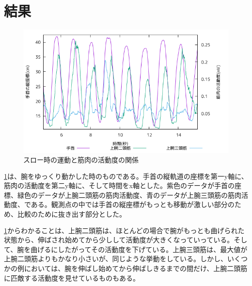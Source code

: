 \documentclass{jsarticle}
\begin{document}
\section{結果}
\begin{figure}[h]
  \begin{center}
    \includegraphics[width=15cm]{images/s1proto.png}
  \end{center}
  \caption{スロー時の運動と筋肉の活動度の関係}
  \label{slowfig}
\end{figure}
\ref{slowfig}は、腕をゆっくり動かした時のものである。手首の縦軌道の座標を第一y軸に、筋肉の活動度を第二y軸に、そして時間をx軸とした。紫色のデータが手首の座標、緑色のデータが上腕二頭筋の筋肉活動度、青のデータが上腕三頭筋の筋肉活動度、である。観測点の中では手首の縦座標がもっとも移動が激しい部分のため、比較のために抜き出す部分とした。

\ref{slowfig}からわかることは、上腕二頭筋は、ほとんどの場合で腕がもっとも曲げられた状態から、伸ばされ始めてから少しして活動度が大きくなっていっている。そして、腕を曲げるにしたがってその活動度を下げている。上腕三頭筋は、最大値が上腕二頭筋よりもかなり小さいが、同じような挙動をしている。しかし、いくつかの例においては、腕を伸ばし始めてから伸ばしきるまでの間だけ、上腕二頭筋に匹敵する活動度を見せているものもある。
\end{document}
